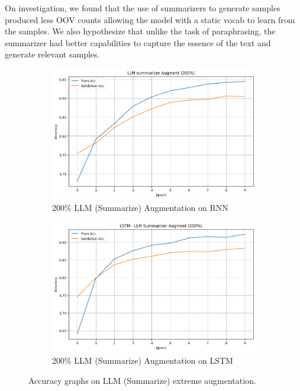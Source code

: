 \documentclass{article}
\begin{document}
On investigation, we found that the use of summarizers to generate samples
produced less OOV counts allowing the model with a static vocab to learn from
the samples. We also hypothesize that unlike the task of paraphrasing, the
summarizer had better capabilities to capture the essence of the text and
generate relevant samples.

\begin{figure}[ht]
  \centering
  \begin{subfigure}[b]{0.45\textwidth}
    \includegraphics[width=\textwidth]{img/llm_summarise_200_rnn.png}
    \caption{200\% LLM (Summarize) Augmentation on RNN}
    \label{fig:llm_summarise_200_rnn}
  \end{subfigure}
  \hfill
  \begin{subfigure}[b]{0.45\textwidth}
    \includegraphics[width=\textwidth]{img/llm_summarise_200_lstm.png}
    \caption{200\% LLM (Summarize) Augmentation on LSTM}
    \label{fig:llm_summarise_200_lstm}
  \end{subfigure}
  \caption{Accuracy graphs on LLM (Summarize) extreme augmentation.}
  \label{fig:llm_extreme_summerizer}
\end{figure}
\end{document}
